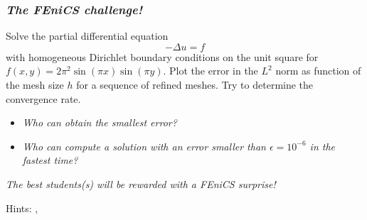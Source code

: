 \begin{frame}
  \frametitle{\emph{The FEniCS challenge!}}

  Solve the partial differential equation
  \begin{equation*}
    -\Delta u = f
  \end{equation*}
  with homogeneous Dirichlet boundary conditions on the unit square
  for $f(x, y) = 2\pi^2\sin(\pi x)\sin(\pi y)$. Plot the error in the
  $L^2$ norm as function of the mesh size $h$ for a sequence of
  refined meshes. Try to determine the convergence rate.

  \begin{itemize}
  \item
    \emph{Who can obtain the smallest error?}
  \item
    \emph{Who can compute a solution with an error smaller than
    $\epsilon = 10^{-6}$ in the fastest time?}
  \end{itemize}

  \emph{The best students(s) will be rewarded with a FEniCS surprise!}

  \bigskip
  Hints: , 

\end{frame}
